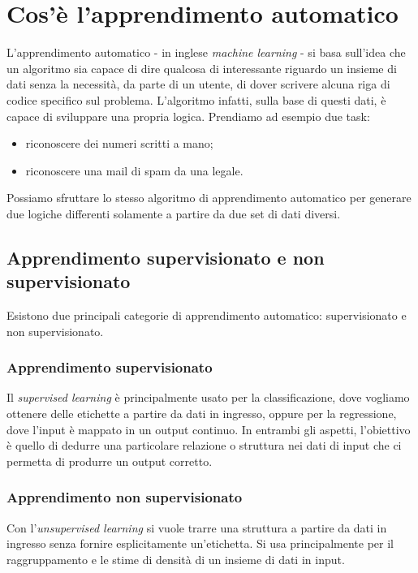 
\section{Cos'è l'apprendimento automatico}
L'apprendimento automatico - in inglese \textit{machine learning} - si basa sull'idea che un algoritmo sia capace di dire qualcosa di interessante riguardo un insieme di dati senza la necessità, da parte di un utente, di dover scrivere alcuna riga di codice specifico sul problema.\cite{site:machine_learning_is_fun} L'algoritmo infatti, sulla base di questi dati, è capace di sviluppare una propria logica. Prendiamo ad esempio due task:
\begin{itemize}
	\setlength\itemsep{0em}
	\item riconoscere dei numeri scritti a mano;
	\item riconoscere una mail di spam da una legale.
\end{itemize}
Possiamo sfruttare lo stesso algoritmo di apprendimento automatico per generare due logiche differenti solamente a partire da due \gls{set} di dati diversi.


\subsection{Apprendimento supervisionato e non supervisionato}
Esistono due principali categorie di apprendimento automatico: supervisionato e non supervisionato.\cite{site:supervised_vs_unsupervised_learning}

\subsubsection*{Apprendimento supervisionato}
Il \textit{supervised learning} è principalmente usato per la classificazione, dove vogliamo ottenere delle etichette a partire da dati in ingresso, oppure per la regressione, dove l'input è mappato in un output continuo. In entrambi gli aspetti, l'obiettivo è quello di dedurre una particolare relazione o struttura nei dati di input che ci permetta di produrre un output corretto.

\subsubsection*{Apprendimento non supervisionato}
Con l'\textit{unsupervised learning} si vuole trarre una struttura a partire da dati in ingresso senza fornire esplicitamente un'etichetta. Si usa principalmente per il raggruppamento e le stime di densità di un insieme di dati in input.



